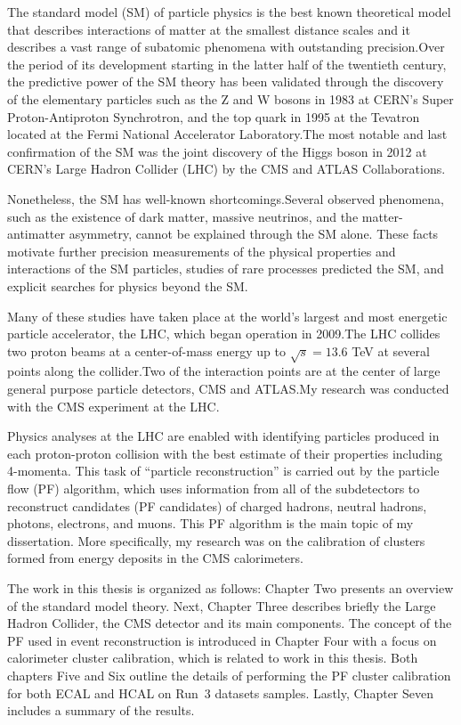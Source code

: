 
The standard model (SM) of particle physics %
is the best known theoretical model that describes interactions of matter at the smallest %
distance scales and it describes a vast range of subatomic phenomena with outstanding precision.Over the period of its development starting in the latter half of the twentieth century, the predictive power of the SM theory has been validated through the discovery of the elementary particles such as the Z and W bosons in 1983 at CERN's Super Proton-Antiproton Synchrotron, and the top quark in 1995 at the Tevatron located at the Fermi National Accelerator Laboratory.The most notable and last confirmation of the SM was the joint discovery of the Higgs boson in 2012 at CERN's Large Hadron Collider (LHC) by the CMS and ATLAS Collaborations.

Nonetheless, the SM has well-known shortcomings.Several observed phenomena, such as the existence of dark matter, massive neutrinos, and the matter-antimatter asymmetry, cannot be explained through the SM alone.
These facts motivate further precision measurements of the physical properties and interactions of the SM particles, studies of rare processes predicted the SM, and explicit searches for physics beyond the SM.

Many of these studies have taken place at the world's largest and most energetic particle accelerator, the LHC, which began operation in 2009.The LHC collides two proton beams at a center-of-mass energy up to $\sqrt{s}=13.6$ TeV at several points along the collider.Two of the interaction points are at the center of large general purpose particle detectors, CMS and ATLAS.My research was conducted with the CMS experiment at the LHC.

Physics analyses at the LHC are enabled with identifying particles produced in each proton-proton collision with the best estimate of their properties including 4-momenta.
This task of ``particle reconstruction'' is carried out by the particle flow (PF) algorithm, which uses information from all of the subdetectors
to reconstruct candidates (PF candidates) of charged hadrons, neutral hadrons, photons, electrons, and muons.
This PF algorithm is the main topic of my dissertation.
More specifically, my research was on the calibration of clusters formed from energy deposits in the CMS calorimeters.


The work in this thesis is organized as follows:
Chapter Two presents an overview of the standard model theory.
Next, Chapter Three describes briefly the Large Hadron Collider, the CMS detector and its main components.
The concept of the PF used in event reconstruction is introduced in Chapter Four with a focus on calorimeter cluster calibration, which is related to work in this thesis.
Both chapters Five and Six outline the details of performing the PF cluster calibration for both ECAL and HCAL on Run~3 datasets samples.
Lastly, Chapter Seven includes a summary of the results.

